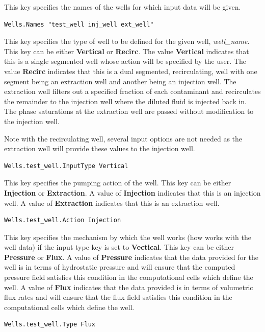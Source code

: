 {
This key specifies the names of the wells for which input data will be
given.
}
\begin{display}\begin{verbatim}
Wells.Names "test_well inj_well ext_well"
\end{verbatim}\end{display}

{
This key specifies the type of well to be defined for the given well,
{\em well\_name}.  This key can be either {\bf Vertical} or
{\bf Recirc}.  The value {\bf Vertical} indicates that this is a
single segmented well whose action will be specified by the user.
The value {\bf Recirc} indicates that this is a dual segmented,
recirculating, well with one segment being an extraction well and
another being an injection well.  The extraction well filters out a
specified fraction of each contaminant and recirculates the remainder
to the injection well where the diluted fluid is injected back in.  The
phase saturations at the extraction well are passed without modification
to the injection well.

Note with the recirculating well, several input options are not needed
as the extraction well will provide these values to the injection well.
}
\begin{display}\begin{verbatim}
Wells.test_well.InputType Vertical
\end{verbatim}\end{display}

{
This key specifies the pumping action of the well.  This key can be
either {\bf Injection} or {\bf Extraction}.  A value of {\bf Injection}
indicates that this is an injection well.  A value of {\bf Extraction}
indicates that this is an extraction well.
}
\begin{display}\begin{verbatim}
Wells.test_well.Action Injection
\end{verbatim}\end{display}

{
This key specifies the mechanism by which the well works (how \parflow{}
works with the well data) if the input type key is set to {\bf Vectical}.
This key can be either {\bf Pressure} or {\bf Flux}.  A value of
{\bf Pressure} indicates that the data provided for the well is in terms
of hydrostatic pressure and \parflow{} will ensure that the computed
pressure field satisfies this condition in the computational cells which
define the well.  A value of {\bf Flux} indicates that the data provided
is in terms of volumetric flux rates and \parflow{} will ensure that the
flux field satisfies this condition in the computational cells which
define the well.
}
\begin{display}\begin{verbatim}
Wells.test_well.Type Flux
\end{verbatim}\end{display}

